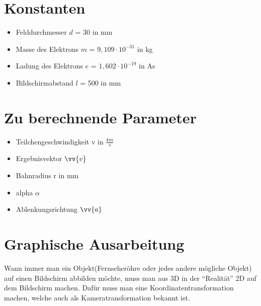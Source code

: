 \section{Konstanten}

\begin{itemize}
    \item Felddurchmesser $d$ = 30 in mm
    \item Masse des Elektrons $m$ =  $9,109 \cdot 10^{-31}$ in kg
    \item Ladung des Elektrons $e$ = $1,602 \cdot 10^{-19}$ in As
    \item Bildschirmabstand $l$ = 500 in mm
\end{itemize}

\section{Zu berechnende Parameter}

\begin{itemize}
    \item Teilchengeschwindigkeit v in $\frac{km}{s}$
    \item Ergebnisvektor $\vv{v}$
    \item Bahnradius r in mm 
    \item alpha $\alpha$
    \item Ablenkungsrichtung $\vv{a}$
\end{itemize}


\section{\textbf{Graphische Ausarbeitung}}
Wann immer man ein Objekt(Fernseheröhre oder jedes andere mögliche Objekt) auf einen Bildschirm abbilden möchte, muss man aus 3D in der "`Realität"' 2D auf dem Bildschirm machen. Dafür muss man eine Koordinatentransformation machen, welche auch als Kameratransformation bekannt ist.

